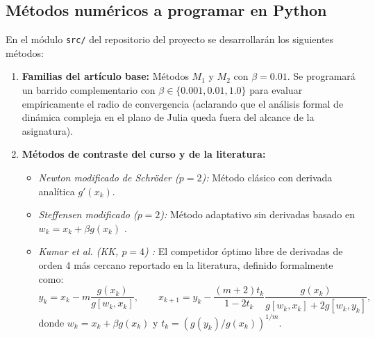 \documentclass[10pt, a4paper]{article}
\begin{document}
\subsection{Métodos numéricos a programar en Python}
En el módulo \texttt{src/} del repositorio del proyecto se desarrollarán los siguientes métodos:
\begin{enumerate}
    \item \textbf{Familias del artículo base:} Métodos $M_1$ y $M_2$ con $\beta = 0.01$. Se programará un barrido complementario con $\beta \in \{0.001, 0.01, 1.0\}$ para evaluar empíricamente el radio de convergencia (aclarando que el análisis formal de dinámica compleja en el plano de Julia queda fuera del alcance de la asignatura).
    \item \textbf{Métodos de contraste del curso y de la literatura:}
    \begin{itemize}
        \item \textit{Newton modificado de Schröder ($p=2$):} Método clásico con derivada analítica $g'(x_k)$.
        \item \textit{Steffensen modificado ($p=2$):} Método adaptativo sin derivadas basado en $w_k = x_k + \beta g(x_k)$ \cite{Traub1964}.
        \item \textit{Kumar et al. (KK, $p=4$) \cite{Kumar2020b}:} El competidor óptimo libre de derivadas de orden 4 más cercano reportado en la literatura, definido formalmente como:
        \begin{equation}
            y_k = x_k - m \frac{g(x_k)}{g[w_k, x_k]}, \qquad x_{k+1} = y_k - \frac{(m+2)t_k}{1-2t_k} \frac{g(x_k)}{g[w_k, x_k] + 2g[w_k, y_k]}, \label{eq:kk}
        \end{equation}
        donde $w_k = x_k + \beta g(x_k)$ y $t_k = (g(y_k)/g(x_k))^{1/m}$.
    \end{itemize}
\end{enumerate}
\end{document}
